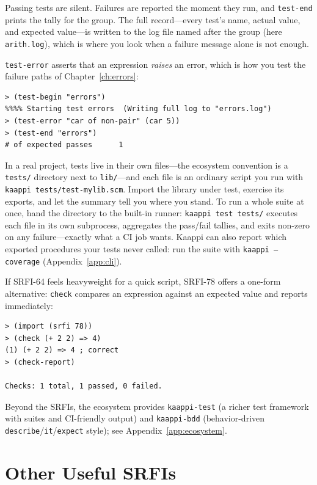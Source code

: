 Passing tests are silent. Failures are reported the moment they run, and \texttt{test-end} prints the tally for the group. The full record---every test's name, actual value, and expected value---is written to the log file named after the group (here \texttt{arith.log}), which is where you look when a failure message alone is not enough.

\texttt{test-error} asserts that an expression \emph{raises} an error, which is how you test the failure paths of Chapter~\ref{ch:errors}:

\begin{lstlisting}[style=repl]
> (test-begin "errors")
%%%% Starting test errors  (Writing full log to "errors.log")
> (test-error "car of non-pair" (car 5))
> (test-end "errors")
# of expected passes      1
\end{lstlisting}

In a real project, tests live in their own files---the ecosystem convention is a \texttt{tests/} directory next to \texttt{lib/}---and each file is an ordinary script you run with \texttt{kaappi tests/test-mylib.scm}. Import the library under test, exercise its exports, and let the summary tell you where you stand. To run a whole suite at once, hand the directory to the built-in runner: \texttt{kaappi test tests/} executes each file in its own subprocess, aggregates the pass/fail tallies, and exits non-zero on any failure---exactly what a CI job wants. Kaappi can also report which exported procedures your tests never called: run the suite with \texttt{kaappi --coverage} (Appendix~\ref{app:cli}).

If SRFI-64 feels heavyweight for a quick script, SRFI-78 offers a one-form alternative: \texttt{check} compares an expression against an expected value and reports immediately:

\begin{lstlisting}[style=repl]
> (import (srfi 78))
> (check (+ 2 2) => 4)
(1) (+ 2 2) => 4 ; correct
> (check-report)

Checks: 1 total, 1 passed, 0 failed.
\end{lstlisting}

Beyond the SRFIs, the ecosystem provides \texttt{kaappi-test} (a richer test framework with suites and CI-friendly output) and \texttt{kaappi-bdd} (behavior-driven \texttt{describe}/\texttt{it}/\texttt{expect} style); see Appendix~\ref{app:ecosystem}.

\section{Other Useful SRFIs}


